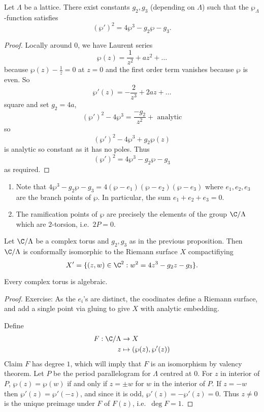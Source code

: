 \documentclass[a4paper]{article}
\begin{document}
\begin{proposition}
  Let \(\Lambda\) be a lattice. There exist constants \(g_2, g_3\) (depending on \(\Lambda\)) such that the \(\wp_\Lambda\)-function satisfies
  \[
    (\wp')^2 = 4 \wp^3 - g_2 \wp - g_3.
  \]
\end{proposition}

\begin{proof}
  Locally around \(0\), we have Laurent series
  \[
    \wp(z) = \frac{1}{z^2} + az^2 + \dots
  \]
  because \(\wp(z) - \frac{1}{z} = 0\) at \(z = 0\) and the first order term vanishes because \(\wp\) is even. So
  \[
    \wp'(z) = - \frac{2}{z^3} + 2az + \dots
  \]
  square and set \(g_2 = 4a\),
  \[
    (\wp')^2 - 4\wp^3 = \frac{-g_2}{z^2} + \text{ analytic}
  \]
  so
  \[
    (\wp')^2 - 4\wp^3 + g_2 \wp(z)
  \]
  is analytic so constant as it has no poles. Thus
  \[
    (\wp')^2 = 4\wp^3 - g_2 \wp - g_3
  \]
  as required.
\end{proof}

\begin{note}\leavevmode
  \begin{enumerate}
  \item Note that \(4\wp^3 - g_2 \wp - g_3 = 4 (\wp - e_1) (\wp - e_2) (\wp - e_3)\) where \(e_1, e_2, e_3\) are the branch points of \(\wp\). In particular, the sum \(e_1 + e_2 + e_3 = 0\).
  \item The ramification points of \(\wp\) are precisely the elements of the group \(\C/\Lambda\) which are \(2\)-torsion, i.e.\ \(2P = 0\).
  \end{enumerate}
\end{note}

\begin{corollary}
  Let \(\C / \Lambda\) be a complex torus and \(g_2, g_3\) as in the previous proposition. Then \(\C / \Lambda\) is conformally isomorphic to the Riemann surface \(X\) compactifiying
  \[
    X' = \{(z, w) \in \C^2: w^2 = 4z^3 - g_2z - g_3\}.
  \]
\end{corollary}

Every complex torus is algebraic.

\begin{proof}
  Exercise: As the \(e_i\)'s are distinct, the coodinates define a Riemann surface, and add a single point via gluing to give \(X\) with analytic embedding.

  Define
  \begin{align*}
    F: \C / \Lambda &\to X \\
    z &\mapsto (\wp(z), \wp'(z))
  \end{align*}
  Claim \(F\) has degree \(1\), which will imply that \(F\) is an isomorphism by valency theorem. Let \(P\) be the period parallelogram for \(\Lambda\) centred at \(0\). For \(z\) in interior of \(P\), \(\wp(z) = \wp(w)\) if and only if \(z = \pm w\) for \(w\) in the interior of \(P\). If \(z = -w\) then \(\wp'(z) = \wp'(-z)\), and since it is odd, \(\wp'(z) = -\wp'(z) = 0\). Thus \(z \neq 0\) is the unique preimage under \(F\) of \(F(z)\), i.e.\ \(\deg F = 1\). %
\end{proof}
\end{document}
